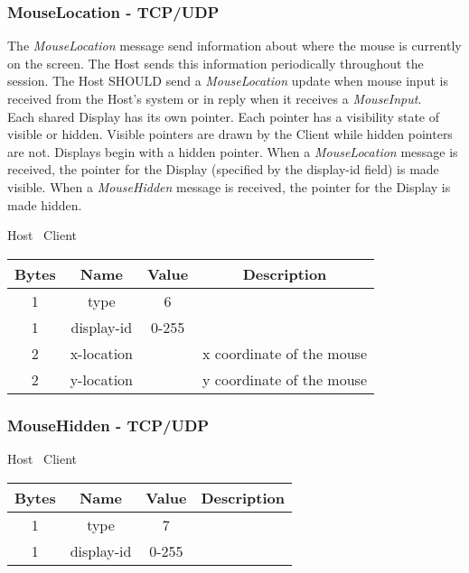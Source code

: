 \subsubsection{MouseLocation - TCP/UDP}

The \emph{MouseLocation} message send information about where the mouse is currently on the screen.
The Host sends this information periodically throughout the session.
The Host SHOULD send a \emph{MouseLocation} update when mouse input is received from the Host's system or in
reply when it receives a \emph{MouseInput}.\\

Each shared Display has its own pointer.
Each pointer has a visibility state of visible or hidden.
Visible pointers are drawn by the Client while hidden pointers are not.
Displays begin with a hidden pointer.
When a \emph{MouseLocation} message is received, the pointer for the Display (specified by the display-id field) is made visible.
When a \emph{MouseHidden} message is received, the pointer for the Display is made hidden.

\begin{center}
    Host \textrightarrow\ Client\\
    \begin{tabular}{|c|c|c|c|}
        \hline
        \textbf{Bytes} & \textbf{Name} & \textbf{Value} & \textbf{Description}      \\
        \hline
        1              & type          & 6              &                           \\
        \hline
        1              & display-id    & 0-255          &                           \\
        \hline
        2              & x-location    &                & x coordinate of the mouse \\
        \hline
        2              & y-location    &                & y coordinate of the mouse \\
        \hline
    \end{tabular}
\end{center}

\subsubsection{MouseHidden - TCP/UDP}

\begin{center}
    Host \textrightarrow\ Client\\
    \begin{tabular}{|c|c|c|c|}
        \hline
        \textbf{Bytes} & \textbf{Name} & \textbf{Value} & \textbf{Description} \\
        \hline
        1              & type          & 7              &                      \\
        \hline
        1              & display-id    & 0-255          &                      \\
        \hline
    \end{tabular}
\end{center}


